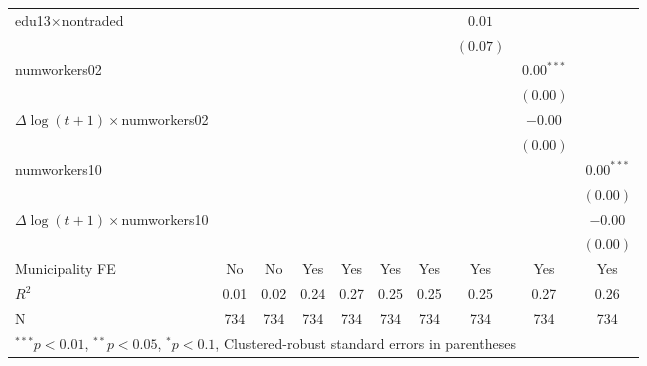 \begin{tabular}{l c c c c c c c c c }
edu13$\times$nontraded      &              &               &              &               &              &              & $0.01$       &               &              \\
                     &              &               &              &               &              &              & $(0.07)$     &               &              \\
numworkers02         &              &               &              &               &              &              &              & $0.00^{***}$  &              \\
                     &              &               &              &               &              &              &              & $(0.00)$      &              \\
$\Delta\log(t+1)\times$numworkers02 &              &               &              &               &              &              &              & $-0.00$       &              \\
                     &              &               &              &               &              &              &              & $(0.00)$      &              \\
numworkers10         &              &               &              &               &              &              &              &               & $0.00^{***}$ \\
                     &              &               &              &               &              &              &              &               & $(0.00)$     \\
$\Delta\log(t+1)\times$numworkers10 &              &               &              &               &              &              &              &               & $-0.00$      \\
                     &              &               &              &               &              &              &              &               & $(0.00)$     \\
\hline
Municipality FE  &No&No&Yes&Yes&Yes&Yes&Yes&Yes&Yes\\ 
\hline
$R^2$                & 0.01         & 0.02          & 0.24         & 0.27          & 0.25         & 0.25         & 0.25         & 0.27          & 0.26         \\
N                    & 734          & 734           & 734          & 734           & 734          & 734          & 734          & 734           & 734          \\
\hline
\multicolumn{10}{l}{\scriptsize{$^{***}p<0.01$, $^{**}p<0.05$, $^*p<0.1$, Clustered-robust standard errors in parentheses}}
\end{tabular}
